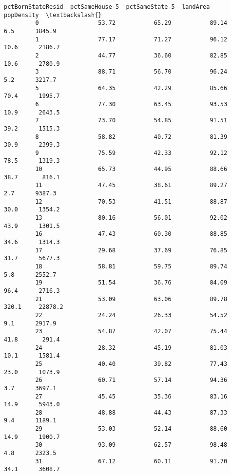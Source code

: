 \documentclass[11pt]{llncs}
\begin{document}
\begin{Verbatim}[commandchars=\\\{\}]
               pctBornStateResid  pctSameHouse-5  pctSameState-5  landArea  popDensity  \textbackslash{}
         0                 53.72           65.29           89.14       6.5      1845.9   
         1                 77.17           71.27           96.12      10.6      2186.7   
         2                 44.77           36.60           82.85      10.6      2780.9   
         3                 88.71           56.70           96.24       5.2      3217.7   
         5                 64.35           42.29           85.66      70.4      1995.7   
         6                 77.30           63.45           93.53      10.9      2643.5   
         7                 73.70           54.85           91.51      39.2      1515.3   
         8                 58.82           40.72           81.39      30.9      2399.3   
         9                 75.59           42.33           92.12      78.5      1319.3   
         10                65.73           44.95           88.66      38.7       816.1   
         11                47.45           38.61           89.27       2.7      9387.3   
         12                70.53           41.51           88.87      30.0      1354.2   
         13                80.16           56.01           92.02      43.9      1301.5   
         16                47.43           60.30           88.85      34.6      1314.3   
         17                29.68           37.69           76.85      31.7      5677.3   
         18                58.81           59.75           89.74       5.8      2552.7   
         19                51.54           36.76           84.09      96.4      2716.3   
         21                53.09           63.06           89.78     320.1     22878.2   
         22                24.24           26.33           54.52       9.1      2917.9   
         23                54.87           42.07           75.44      41.8       291.4   
         24                28.32           45.19           81.03      10.1      1581.4   
         25                40.40           39.82           77.43      23.0      1073.9   
         26                60.71           57.14           94.36       3.7      3697.1   
         27                45.45           35.36           83.16      14.9      5943.0   
         28                48.88           44.43           87.33       9.4      1189.1   
         29                53.03           52.14           88.60      14.9      1900.7   
         30                93.09           62.57           98.48       4.8      2323.5   
         31                67.12           60.11           91.70      34.1      3608.7   

\end{Verbatim}
\end{document}
